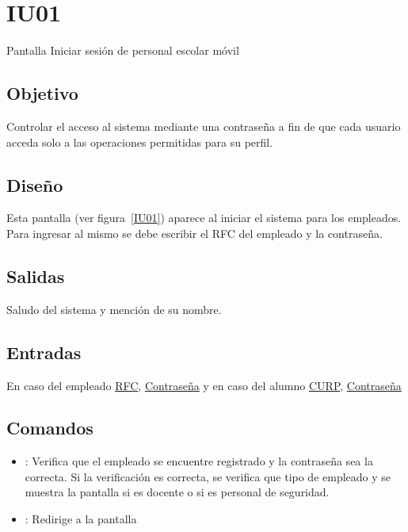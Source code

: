 
\section{IU01} {Pantalla Iniciar sesión de personal escolar móvil} 

\subsection{Objetivo}
	Controlar el acceso al sistema mediante una contraseña a fin de que cada usuario acceda solo a las operaciones permitidas para su perfil.

\subsection{Diseño}
	Esta pantalla  (ver figura~\ref{IU01}) aparece al iniciar el sistema para los empleados. Para ingresar al mismo se debe escribir el RFC del empleado y la contraseña. 


\subsection{Salidas}

Saludo del sistema y mención de su nombre.

\subsection{Entradas}
En caso del empleado \hyperlink{Empleado.RFC}{RFC}, \hyperlink{Empleado.Contraseña}{Contraseña} y en caso del alumno \hyperlink{Alumn.CURP}{CURP}, \hyperlink{Alumno.Contraseña}{Contraseña} 

\subsection{Comandos}
\begin{itemize}
	\item {}: Verifica que el empleado se encuentre registrado y la contraseña sea la correcta. Si la verificación es correcta, se verifica que tipo de empleado y se muestra la pantalla  si es docente o  si es personal de seguridad.
	
	\item {}: Redirige a la pantalla 
	
\end{itemize}

